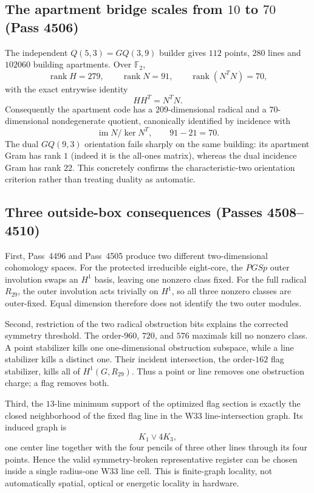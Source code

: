 \subsection{The apartment bridge scales from $10$ to $70$ (Pass 4506)}

The independent $Q(5,3)=GQ(3,9)$ builder gives $112$ points, $280$ lines and
$102060$ building apartments.  Over $\mathbb F_2$,
\[
\operatorname{rank}H=279,\qquad
\operatorname{rank}N=91,\qquad
\operatorname{rank}(N^TN)=70,
\]
with the exact entrywise identity
\[
HH^T=N^TN.
\]
Consequently the apartment code has a $209$-dimensional radical and a
$70$-dimensional nondegenerate quotient, canonically identified by incidence with
\[
\operatorname{im}N/\ker N^T,
\qquad 91-21=70.
\]
The dual $GQ(9,3)$ orientation fails sharply on the same building: its apartment
Gram has rank $1$ (indeed it is the all-ones matrix), whereas the dual incidence
Gram has rank $22$.  This concretely confirms the characteristic-two orientation
criterion rather than treating duality as automatic.

\subsection{Three outside-box consequences (Passes 4508--4510)}

First, Pass~4496 and Pass~4505 produce two different two-dimensional cohomology
spaces.  For the protected irreducible eight-core, the $PGSp$ outer involution
swaps an $H^1$ basis, leaving one nonzero class fixed.  For the full radical
$R_{29}$, the outer involution acts trivially on $H^1$, so all three nonzero
classes are outer-fixed.  Equal dimension therefore does not identify the two
outer modules.

Second, restriction of the two radical obstruction bits explains the corrected
symmetry threshold.  The order-$960$, $720$, and $576$ maximals kill no nonzero
class.  A point stabilizer kills one one-dimensional obstruction subspace, while
a line stabilizer kills a distinct one.  Their incident intersection, the
order-$162$ flag stabilizer, kills all of $H^1(G,R_{29})$.  Thus a point or line
removes one obstruction charge; a flag removes both.

Third, the $13$-line minimum support of the optimized flag section is exactly the
closed neighborhood of the fixed flag line in the W33 line-intersection graph.
Its induced graph is
\[
\boxed{K_1\vee4K_3},
\]
one center line together with the four pencils of three other lines through its
four points.  Hence the valid symmetry-broken representative register can be
chosen inside a single radius-one W33 line cell.  This is finite-graph locality,
not automatically spatial, optical or energetic locality in hardware.

